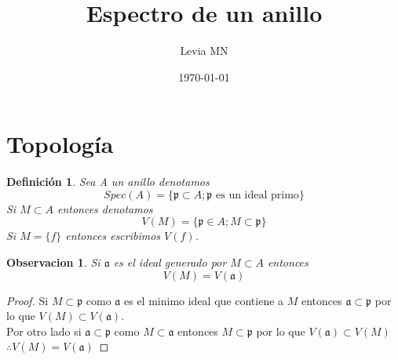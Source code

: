 \documentclass{article}
\title{Espectro de un anillo}
\author{Levia MN}
\date{\today}
\newtheorem{definition}{Definición}
\newtheorem{observation}{Observacion}
\begin{document}
\maketitle
\section{Topología}
\begin{definition}
    Sea A un anillo denotamos $$Spec(A)=\{\mathfrak{p} \subset A; \mathfrak{p} \mbox{ es un ideal primo} \}$$
    Si $M \subset A$ entonces denotamos $$V(M) = \{\mathfrak{p} \in A; M \subset \mathfrak{p}\}$$
    Si $M=\{f\}$ entonces escribimos $V(f)$.
\end{definition}

\begin{observation}
    Si $\mathfrak{a}$ es el ideal generado por $M \subset A$ entonces
    $$V(M) = V(\mathfrak{a})$$
\end{observation}

\begin{proof}
    Si $M \subset \mathfrak{p}$ como $\mathfrak{a}$ es el minimo
    ideal que contiene a $M$ entonces $\mathfrak{a} \subset \mathfrak{p}$
    por lo que $V(M) \subset V(\mathfrak{a})$.
    \\
    Por otro lado si $\mathfrak{a} \subset \mathfrak{p}$ como
    $M \subset \mathfrak{a}$ entonces $M \subset \mathfrak{p}$
    por lo que $V(\mathfrak{a}) \subset V(M)$
    \\
    $\therefore V(M) = V(\mathfrak{a})$
\end{proof}
\end{document}
